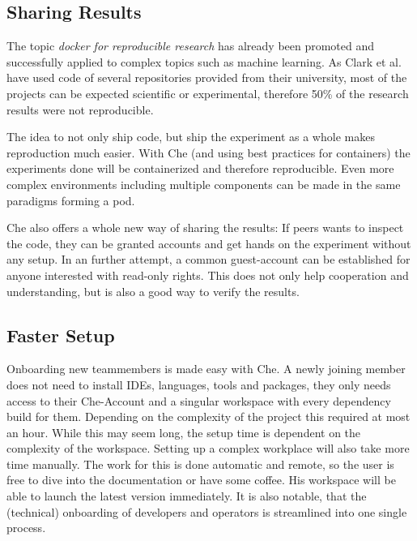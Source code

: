 \documentclass[english,utf8]{lni}
\begin{document}
\subsection{Sharing Results}
The topic \textit{docker for reproducible research} has already been promoted \cite{BO15} and successfully applied to complex topics \cite{ST16} such as machine learning. 
As Clark et al. \cite{CL14} have used code of several repositories provided from their university, most of the projects can be expected scientific or experimental, therefore 50\% of the research results were not reproducible. 

The idea to not only ship code, but ship the experiment as a whole makes reproduction much easier. 
With Che (and using best practices for containers) the experiments done will be containerized and therefore reproducible. 
Even more complex environments including multiple components can be made in the same paradigms forming a pod. 

Che also offers a whole new way of sharing the results: 
If peers wants to inspect the code, they can be granted accounts and get hands on the experiment without any setup. 
In an further attempt, a common guest-account can be established for anyone interested with read-only rights. 
This does not only help cooperation and understanding, but is also a good way to verify the results.
\subsection{Faster Setup}
Onboarding new teammembers is made easy with Che. 
A newly joining member does not need to install IDEs, languages, tools and packages, they only needs access to their Che-Account and a singular workspace with every dependency build for them.
Depending on the complexity of the project this required at most an hour. 
While this may seem long, the setup time is dependent on the complexity of the workspace. 
Setting up a complex workplace will also take more time manually. 
The work for this is done automatic and remote, so the user is free to dive into the documentation or have some coffee. 
His workspace will be able to launch the latest version immediately.
It is also notable, that the (technical) onboarding of developers and operators is streamlined into one single process. 
\end{document}
